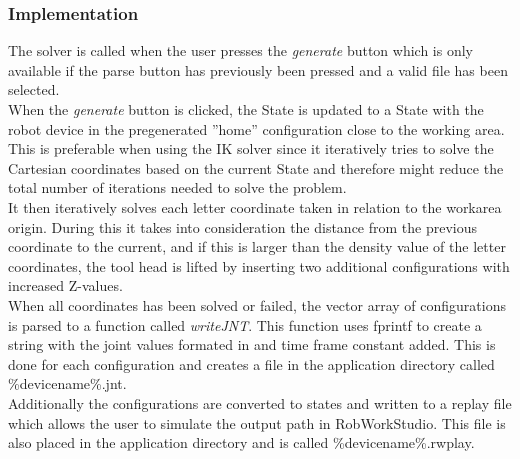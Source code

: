 \subsubsection{Implementation}
\label{sec:pathplanningImpl}
The solver is called when the user presses the \textit{generate} button which is only available if the parse button has previously been pressed and a valid file has been selected.\\
When the \textit{generate} button is clicked, the State is updated to a State with the robot device in the pregenerated ''home'' configuration close to the working area. This is preferable when using the IK solver since it iteratively tries to solve the Cartesian coordinates based on the current State and therefore might reduce the total number of iterations needed to solve the problem.\\
It then iteratively solves each letter coordinate taken in relation to the workarea origin. During this it takes into consideration the distance from the previous coordinate to the current, and if this is larger than the density value of the letter coordinates, the tool head is lifted by inserting two additional configurations with increased Z-values.\\
When all coordinates has been solved or failed, the vector array of configurations is parsed to a function called \textit{writeJNT}. This function uses fprintf to create a string with the joint values formated in and time frame constant added. This is done for each configuration and creates a file in the application directory called \%devicename\%.jnt.\\
Additionally the configurations are converted to states and written to a replay file which allows the user to simulate the output path in RobWorkStudio. This file is also placed in the application directory and is called \%devicename\%.rwplay.
